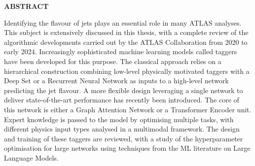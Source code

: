 \vspace*{\fill}
\begin{center}
\textbf{\large \color{oxfordblue} ABSTRACT}
\end{center}
Identifying the flavour of jets plays an essential role in many ATLAS analyses. This subject is extensively discussed in this thesis, with a complete review of the algorithmic developments carried out by the ATLAS Collaboration from 2020 to early 2024. Increasingly sophisticated machine learning models called taggers have been developed for this purpose. The classical approach relies on a hierarchical construction combining low-level physically motivated taggers with a Deep Set or a Recurrent Neural Network as inputs to a high-level network predicting the jet flavour. A more flexible design leveraging a single network to deliver state-of-the-art performance has recently been introduced. The core of this network is either a Graph Attention Network or a Transformer Encoder unit. Expert knowledge is passed to the model by optimising multiple tasks, with different physics input types analysed in a multimodal framework. The design and training of these taggers are reviewed, with a study of the hyperparameter optimisation for large networks using techniques from the ML literature on Large Language Models. \\

